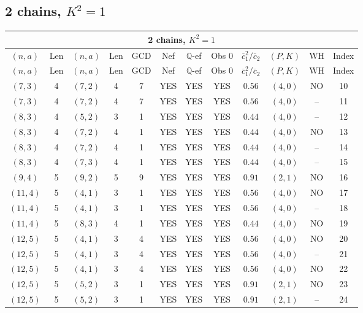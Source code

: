 \subsection{2 chains, $K^2 = 1$}
\begin{longtable}{|c|c|c|c|c|c|c|c|c|c|c|c|}
\hline
\multicolumn{12}{|c|}{2 chains, $K^2 = 1$}\\
\hline
$(n,a)$ & Len & $(n,a)$ & Len & GCD & Nef & $\mathbb Q$-ef & Obs 0 & $\overline c_1^2 / \overline c_2$ & $(P,K)$ & WH & Index\\
\hline
\endfirsthead

\hline
$(n,a)$ & Len & $(n,a)$ & Len & GCD & Nef & $\mathbb Q$-ef & Obs 0 & $\overline c_1^2 / \overline c_2$ & $(P,K)$ & WH & Index\\
\hline
\endhead
\hline
\endfoot

$(7,3)$ & 4 & $(7,2)$ & 4 & 7 & YES & YES & YES & $0.56$ & $(4,0)$ & NO & 10\\
$(7,3)$ & 4 & $(7,2)$ & 4 & 7 & YES & YES & YES & $0.56$ & $(4,0)$ & -- & 11\\
$(8,3)$ & 4 & $(5,2)$ & 3 & 1 & YES & YES & YES & $0.44$ & $(4,0)$ & -- & 12\\
$(8,3)$ & 4 & $(7,2)$ & 4 & 1 & YES & YES & YES & $0.44$ & $(4,0)$ & NO & 13\\
$(8,3)$ & 4 & $(7,2)$ & 4 & 1 & YES & YES & YES & $0.44$ & $(4,0)$ & -- & 14\\
$(8,3)$ & 4 & $(7,3)$ & 4 & 1 & YES & YES & YES & $0.44$ & $(4,0)$ & -- & 15\\
$(9,4)$ & 5 & $(9,2)$ & 5 & 9 & YES & YES & YES & $0.91$ & $(2,1)$ & NO & 16\\
$(11,4)$ & 5 & $(4,1)$ & 3 & 1 & YES & YES & YES & $0.56$ & $(4,0)$ & NO & 17\\
$(11,4)$ & 5 & $(4,1)$ & 3 & 1 & YES & YES & YES & $0.56$ & $(4,0)$ & -- & 18\\
$(11,4)$ & 5 & $(8,3)$ & 4 & 1 & YES & YES & YES & $0.44$ & $(4,0)$ & NO & 19\\
$(12,5)$ & 5 & $(4,1)$ & 3 & 4 & YES & YES & YES & $0.56$ & $(4,0)$ & NO & 20\\
$(12,5)$ & 5 & $(4,1)$ & 3 & 4 & YES & YES & YES & $0.56$ & $(4,0)$ & -- & 21\\
$(12,5)$ & 5 & $(4,1)$ & 3 & 4 & YES & YES & YES & $0.56$ & $(4,0)$ & NO & 22\\
$(12,5)$ & 5 & $(5,2)$ & 3 & 1 & YES & YES & YES & $0.91$ & $(2,1)$ & NO & 23\\
$(12,5)$ & 5 & $(5,2)$ & 3 & 1 & YES & YES & YES & $0.91$ & $(2,1)$ & -- & 24\\

\end{longtable}
